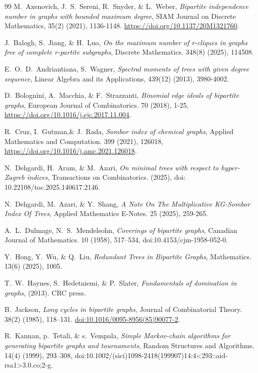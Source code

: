 \documentclass{article}
\theoremstyle{definition}
\begin{document}
\begin{thebibliography}{99}
  M.~Axenovich, J.~S.~Sereni, R.~Snyder, \& L.~Weber, \emph{Bipartite independence number in graphs with bounded maximum degree}, SIAM Journal on Discrete Mathematics, 35(2) (2021), 1136-1148. \url{https://doi.org/10.1137/20M1321760}.

 J.~Balogh, S.~Jiang, \& H.~Luo, \emph{On the maximum number of r-cliques in graphs free of complete r-partite subgraphs}, Discrete Mathematics. 348(8) (2025), 114508.

 E.~O.~D.~Andriantiana, S.~Wagner, \emph{Spectral moments of trees with given degree sequence}, Linear Algebra and its Applications, 439(12) (2013), 3980-4002.

 D.~Bolognini, A.~Macchia, \& F.~Strazzanti, \emph{Binomial edge ideals of bipartite graphs}, European Journal of Combinatorics. 70 (2018), 1-25, \url{https://doi.org/10.1016/j.ejc.2017.11.004}.

 R.~Cruz, I.~Gutman,\& J.~Rada, \emph{Sombor index of chemical graphs}, Applied Mathematics and Computation. 399 (2021), 126018, \url{https://doi.org/10.1016/j.amc.2021.126018}.

 N.~Dehgardi, H.~Aram, \& M.~Azari, \emph{On minimal trees with respect to hyper-Zagreb indices}, Transactions on Combinatorics. (2025), doi: 10.22108/toc.2025.140617.2146.

  N.~Dehgardi, M.~Azari, \& Y.~Shang, \emph{A Note On The Multiplicative KG-Sombor Index Of Trees}, Applied Mathematics E-Notes. 25 (2025), 259-265.

  A.~L.~Dulmage, N.~S.~Mendelsohn, \emph{Coverings of bipartite graphs}, Canadian Journal of Mathematics. 10 (1958), 517–534, doi:10.4153/cjm-1958-052-0.

 Y.~Hong, Y.~Wu, \& Q.~Liu, \emph{Redundant Trees in Bipartite Graphs}, Mathematics. 13(6) (2025), 1005.

 T.~W.~Haynes, S.~Hedetniemi, \& P.~Slater, \emph{Fundamentals of domination in graphs},  (2013). CRC press.

  B.~Jackson, \emph{Long cycles in bipartite graphs}, Journal of Combinatorial Theory. 38(2) (1985), 118–131. \url{doi:10.1016/0095-8956(85)90077-2}.

 R.~Kannan, p.~Tetali, \& s.~Vempala, \emph{Simple Markov-chain algorithms for generating bipartite graphs and tournaments}, Random Structures and Algorithms.  14(4) (1999), 293–308, doi:10.1002/(sici)1098-2418(199907)14:4<293::aid-rsa1>3.0.co;2-g.


\end{thebibliography}
\end{document}
